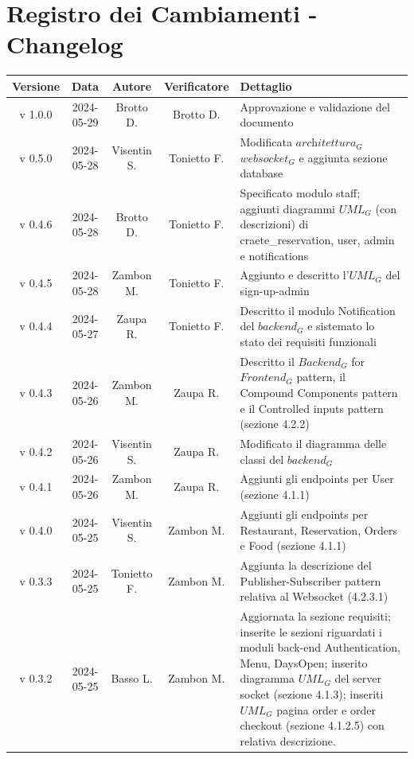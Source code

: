 \documentclass[12pt, oneside]{article}
\begin{document}
\section*{Registro dei Cambiamenti - Changelog}
\begin{longtable}{|c|c|c|c|p{7cm}|}
\hline
\textbf{Versione} & \textbf{Data} & \textbf{Autore} & \textbf{Verificatore} & 
\textbf{Dettaglio} \\
\hline
v 1.0.0 & 2024-05-29 & Brotto D. & Brotto D. & Approvazione e validazione del documento \\
\hline
v 0.5.0 & 2024-05-28 & Visentin S. & Tonietto F. & Modificata $\textit{architettura}_G$ $\textit{websocket}_G$ e aggiunta sezione database  \\
\hline
v 0.4.6 & 2024-05-28 & Brotto D. & Tonietto F. & Specificato modulo staff; aggiunti diagrammi $\textit{UML}_G$ (con descrizioni) di craete\_reservation, user, admin e notifications  \\
\hline
v 0.4.5 & 2024-05-28 & Zambon M. & Tonietto F. & Aggiunto e descritto l'$\textit{UML}_G$ del sign-up-admin  \\
\hline
v 0.4.4 & 2024-05-27 & Zaupa R. & Tonietto F. & Descritto il modulo Notification del $\textit{backend}_G$ e sistemato lo stato dei requisiti funzionali \\
\hline
v 0.4.3 & 2024-05-26 & Zambon M. & Zaupa R. & Descritto il $\textit{Backend}_G$ for $\textit{Frontend}_G$ pattern, il Compound Components pattern e il Controlled inputs pattern (sezione 4.2.2) \\
\hline
v 0.4.2 & 2024-05-26 & Visentin S. & Zaupa R. & Modificato il diagramma delle classi del $\textit{backend}_G$ \\
\hline
v 0.4.1 & 2024-05-26 & Zambon M. & Zaupa R. & Aggiunti gli endpoints per User (sezione 4.1.1) \\
\hline
v 0.4.0 & 2024-05-25 & Visentin S. & Zambon M. & Aggiunti gli endpoints per Restaurant, Reservation, Orders e Food (sezione 4.1.1) \\
\hline
v 0.3.3 & 2024-05-25 & Tonietto F. & Zambon M. & Aggiunta la descrizione del Publisher-Subscriber pattern relativa al Websocket (4.2.3.1) \\
\hline
v 0.3.2 & 2024-05-25 & Basso L. & Zambon M. & Aggiornata la sezione requisiti; inserite le sezioni riguardati i moduli back-end Authentication, Menu, DaysOpen; inserito diagramma $\textit{UML}_G$ del server socket (sezione 4.1.3); inseriti $\textit{UML}_G$ pagina order e order checkout (sezione 4.1.2.5) con relativa descrizione. \\

\end{longtable}
\end{document}

